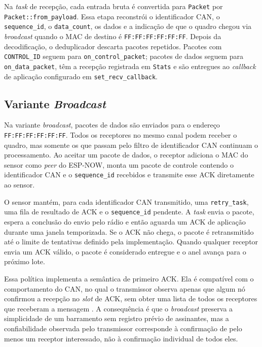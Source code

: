 Na \emph{task} de recepção, cada entrada bruta é convertida para \texttt{Packet} por
\texttt{Packet::from\_payload}. Essa etapa reconstrói o identificador CAN, o
\texttt{sequence\_id}, o \texttt{data\_count}, os dados e a indicação de que o
quadro chegou via \emph{broadcast} quando o MAC de destino é
\texttt{FF:FF:FF:FF:FF:FF}. Depois da decodificação, o deduplicador descarta
pacotes repetidos. Pacotes com \texttt{CONTROL\_ID} seguem para
\texttt{on\_control\_packet}; pacotes de dados seguem para
\texttt{on\_data\_packet}, têm a recepção registrada em \texttt{Stats} e são
entregues ao \emph{callback} de aplicação configurado em \texttt{set\_recv\_callback}.

\subsection{Variante \emph{Broadcast}}

Na variante \emph{broadcast}, pacotes de dados são enviados para o endereço
\texttt{FF:FF:FF:FF:FF:FF}. Todos os receptores no mesmo canal podem receber o
quadro, mas somente os que passam pelo filtro de identificador CAN continuam o processamento.
Ao aceitar um pacote de dados, o receptor adiciona o MAC do sensor como \emph{peer} do
ESP-NOW, monta um pacote de controle contendo o identificador CAN e o
\texttt{sequence\_id} recebidos e transmite esse ACK diretamente ao sensor.

O sensor mantém, para cada identificador CAN transmitido, uma \texttt{retry\_task}, uma fila
de resultado de ACK e o \texttt{sequence\_id} pendente. A \emph{task} envia o pacote,
espera a conclusão do envio pelo rádio e então aguarda um ACK de aplicação durante
uma janela temporizada. Se o ACK não chega, o pacote é retransmitido até o limite
de tentativas definido pela implementação. Quando qualquer receptor envia um ACK
válido, o pacote é considerado entregue e o anel avança para o próximo lote.

Essa política implementa a semântica de primeiro ACK. Ela é compatível com o
comportamento do CAN, no qual o transmissor observa apenas que algum nó confirmou
a recepção no \emph{slot} de ACK, sem obter uma lista de todos os receptores que
receberam a mensagem \cite{iso11898_1_2024}. A consequência é que o \emph{broadcast}
preserva a simplicidade de um barramento sem registro prévio de assinantes, mas a
confiabilidade observada pelo transmissor corresponde à confirmação de pelo menos
um receptor interessado, não à confirmação individual de todos eles.

